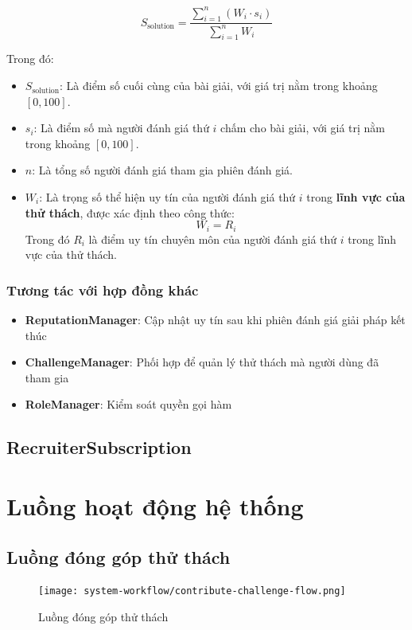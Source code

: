 \[
S_{\text{solution}}= \frac{\displaystyle\sum_{i=1}^{n} (W_{i} \cdot s_{i})}{\displaystyle\sum_{i=1}^{n} W_{i}}
\]

Trong đó:

\begin{itemize}
  \item $S_{\text{solution}}$: Là điểm số cuối cùng của bài giải, với giá trị nằm trong khoảng $[0, 100]$.
  \item $s_{i}$: Là điểm số mà người đánh giá thứ $i$ chấm cho bài giải, với giá trị nằm trong khoảng $[0, 100]$.
  \item $n$: Là tổng số người đánh giá tham gia phiên đánh giá.
  \item $W_{i}$: Là trọng số thể hiện uy tín của người đánh giá thứ $i$ trong \textbf{lĩnh vực của thử thách}, được xác định theo công thức:
  \[
  W_{i} = R_{i}
  \]
  Trong đó $R_{i}$ là điểm uy tín chuyên môn của người đánh giá thứ $i$ trong lĩnh vực của thử thách.
\end{itemize}

\subsubsection{Tương tác với hợp đồng khác}

\begin{itemize}
  \item \textbf{ReputationManager}: Cập nhật uy tín sau khi phiên đánh giá giải pháp kết thúc
  \item \textbf{ChallengeManager}: Phối hợp để quản lý thử thách mà người dùng đã tham gia
  \item \textbf{RoleManager}: Kiểm soát quyền gọi hàm
\end{itemize}

\subsection{RecruiterSubscription}

\section{Luồng hoạt động hệ thống}

\subsection{Luồng đóng góp thử thách}

\begin{figure}[H]
  \centering
  \texttt{[image: system-workflow/contribute-challenge-flow.png]}
  \caption{Luồng đóng góp thử thách}
  \label{fig:contribute-challenge-flow}
\end{figure}

